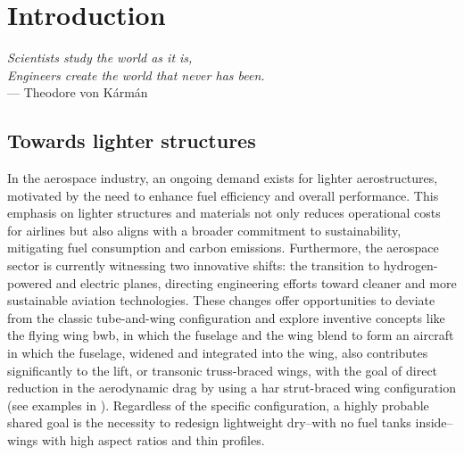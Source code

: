 \newpage
\chapter*{Introduction}
{}
%
\glsresetall %



\textit{Scientists study the world as it is,}\\
\textit{Engineers create the world that never has been.} \vspace{5pt} \\
--- Theodore von K\'arm\'an \\

\section*{Towards lighter structures}

In the aerospace industry, an ongoing demand exists for lighter aerostructures, motivated by the need to enhance fuel efficiency and overall performance. This emphasis on lighter structures and materials not only reduces operational costs for airlines but also aligns with a broader commitment to sustainability, mitigating fuel consumption and carbon emissions. Furthermore, the aerospace sector is currently witnessing two innovative shifts: the transition to hydrogen-powered and electric planes, directing engineering efforts toward cleaner and more sustainable aviation technologies. These changes offer opportunities to deviate from the classic tube-and-wing configuration and explore inventive concepts like the flying wing \gls{bwb}, in which the fuselage and the wing blend to form an aircraft in which the fuselage, widened and integrated into the wing, also contributes significantly to the lift, or transonic truss-braced wings, with the goal of direct reduction in the aerodynamic drag by using a \gls{har} strut-braced wing configuration (see examples in ). Regardless of the specific configuration, a highly probable shared goal is the necessity to redesign lightweight dry--\ie with no fuel tanks inside--wings with high aspect ratios and thin profiles.

